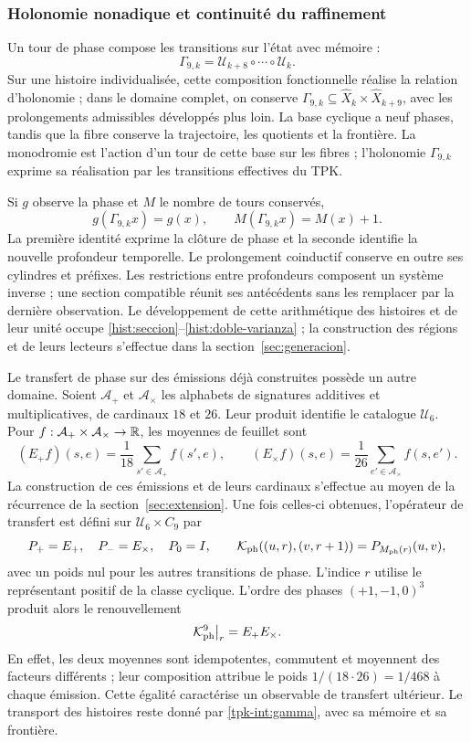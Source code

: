 \subsubsection{Holonomie nonadique et continuité du raffinement}
\label{tpk-int:holonomia}

Un tour de phase compose les transitions sur l'état avec mémoire :
\begin{equation}
 \Gamma_{9,k}=\mathcal U_{k+8}\circ\cdots\circ\mathcal U_k.
 \label{tpk-int:gamma}
\end{equation}
Sur une histoire individualisée, cette composition fonctionnelle réalise la relation d'holonomie ; dans le domaine complet, on conserve \(\Gamma_{9,k}\subseteq\widehat X_k\times\widehat X_{k+9}\), avec les prolongements admissibles développés plus loin. La base cyclique a neuf phases, tandis que la fibre conserve la trajectoire, les quotients et la frontière. La monodromie est l'action d'un tour de cette base sur les fibres ; l'holonomie \(\Gamma_{9,k}\) exprime sa réalisation par les transitions effectives du TPK.

Si \(g\) observe la phase et \(M\) le nombre de tours conservés,
\[
 g(\Gamma_{9,k}x)=g(x),\qquad M(\Gamma_{9,k}x)=M(x)+1.
\]
La première identité exprime la clôture de phase et la seconde identifie
la nouvelle profondeur temporelle. Le prolongement coinductif conserve
en outre ses cylindres et préfixes. Les restrictions entre profondeurs
composent un système inverse ; une section compatible réunit ses
antécédents sans les remplacer par la dernière observation. Le développement
de cette arithmétique des histoires et de leur unité occupe
\ref{hist:seccion}--\ref{hist:doble-varianza} ; la construction des
régions et de leurs lecteurs s'effectue dans la section~\ref{sec:generacion}.

Le transfert de phase sur des émissions déjà construites possède un autre
domaine. Soient \(\mathcal A_+\) et \(\mathcal A_\times\) les
alphabets de signatures additives et multiplicatives, de cardinaux \(18\)
et \(26\). Leur produit identifie le catalogue \(\mathcal U_6\).
Pour \(f:\mathcal A_+\times\mathcal A_\times\to\mathbb R\),
les moyennes de feuillet sont
\[
 (E_+f)(s,e)=\frac1{18}\sum_{s'\in\mathcal A_+}f(s',e),\qquad
 (E_\times f)(s,e)=\frac1{26}\sum_{e'\in\mathcal A_\times}f(s,e').
\]
La construction de ces émissions et de leurs cardinaux s'effectue au moyen de la récurrence de la section~\ref{sec:extension}. Une fois celles-ci obtenues, l'opérateur de transfert est défini sur \(\mathcal U_6\times C_9\) par
\[
 P_+=E_+,\quad P_-=E_\times,\quad P_0=I,\qquad
 \mathcal K_{\rm ph}((u,r),(v,r+1))=P_{M_{\rm ph}(r)}(u,v),
\]
avec un poids nul pour les autres transitions de phase. L'indice
\(r\) utilise le représentant positif de la classe cyclique.
L'ordre des phases \((+1,-1,0)^3\) produit alors le renouvellement
\[
 \mathcal K_{\rm ph}^{9}\big|_r=E_+E_\times.
\]
En effet, les deux moyennes sont idempotentes, commutent et moyennent des facteurs
différents ; leur composition attribue le poids \(1/(18\cdot26)=1/468\)
à chaque émission. Cette égalité caractérise un observable de transfert
ultérieur. Le transport des histoires reste donné par
\eqref{tpk-int:gamma}, avec sa mémoire et sa frontière.

